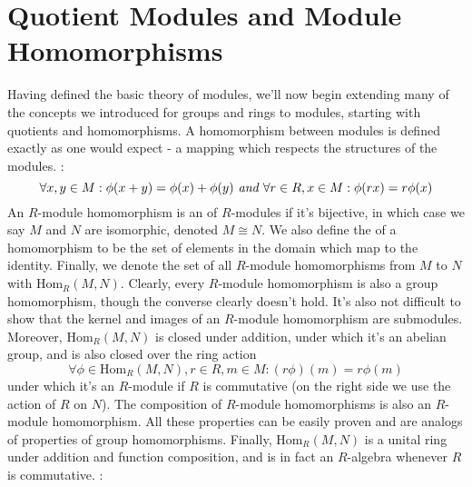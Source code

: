 \documentclass{article}
\begin{document}
\section{Quotient Modules and Module Homomorphisms}
Having defined the basic theory of modules, we'll now begin extending many of the concepts we introduced for groups and rings to modules, starting with quotients and homomorphisms. A homomorphism between modules is defined exactly as one would expect - a mapping which respects the structures of the modules.
\nn
{}: 
$$ \forall x, y \in M: \phi(x + y) = \phi(x) + \phi(y) \textit{ and } \forall r \in R, x \in M: \phi(r x) = r \phi(x) $$
An $ R $-module homomorphism is an  of $ R $-modules if it's bijective, in which case we say $ M $ and $ N $ are isomorphic, denoted $ M \cong N $. We also define the  of a homomorphism to be the set of elements in the domain which map to the identity. Finally, we denote the set of all $ R $-module homomorphisms from $ M $ to $ N $ with $ \text{Hom}_R (M, N) $. Clearly, every $ R $-module homomorphism is also a group homomorphism, though the converse clearly doesn't hold. It's also not difficult to show that the kernel and images of an $ R $-module homomorphism are submodules. Moreover, $ \text{Hom}_R (M, N) $ is closed under addition, under which it's an abelian group, and is also closed over the ring action 
$$ \forall \phi \in \text{Hom}_R(M, N), r \in R, m \in M: (r \phi)(m) = r \phi(m) $$
under which it's an $ R $-module if $ R $ is commutative (on the right side we use the action of $ R $ on $ N $). The composition of $ R $-module homomorphisms is also an $ R $-module homomorphism. All these properties can be easily proven and are analogs of properties of group homomorphisms. Finally, $ \text{Hom}_R (M, N) $ is a unital ring under addition and function composition, and is in fact an $ R $-algebra whenever $ R $ is commutative.
\nn
{}: 
\nn
\end{document}
